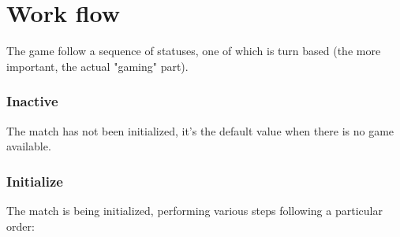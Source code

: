 	\section{Work flow}
	\label{workflow:general}
		
		The game follow a sequence of statuses, one of which is turn based (the more important, the actual "gaming" part).
	
		\subsubsection{Inactive}
		
			The match has not been initialized, it's the default value when there is no game available.
	
		\subsubsection{Initialize}
		
			The match is being initialized, performing various steps following a particular order:
			
